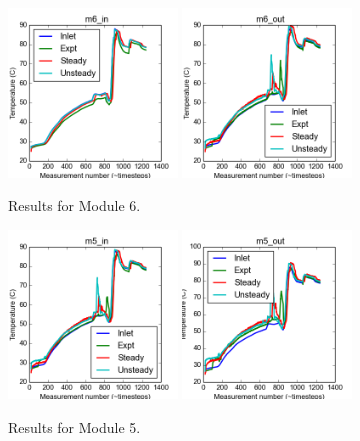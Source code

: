 \documentclass{article}
\begin{document}
\begin{figure}[!ht]
\centering
\includegraphics[width=0.4\textwidth]{../../data/ICSolar/images/Jan31_m6_in_compare.png}\hspace{0.05\textwidth}
\includegraphics[width=0.4\textwidth]{../../data/ICSolar/images/Jan31_m6_out_compare.png}\hspace{0.05\textwidth}\\
\caption{Results for Module 6.}\end{figure}
\begin{figure}[!ht]
\centering
\includegraphics[width=0.4\textwidth]{../../data/ICSolar/images/Jan31_m5_in_compare.png}\hspace{0.05\textwidth}
\includegraphics[width=0.4\textwidth]{../../data/ICSolar/images/Jan31_m5_out_compare.png}\hspace{0.05\textwidth}\\
\caption{Results for Module 5.}\end{figure}
\end{document}
